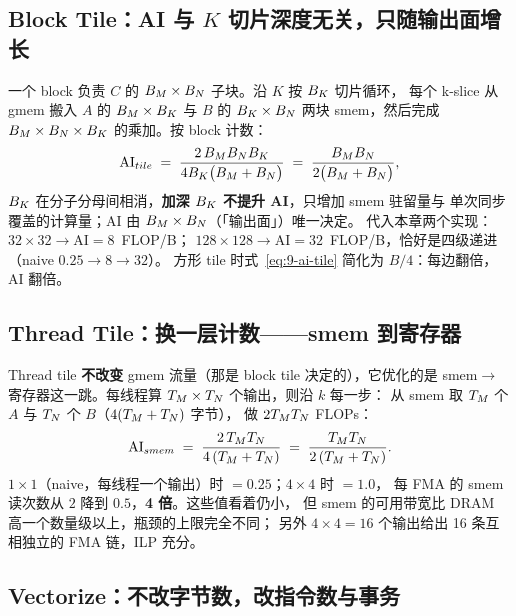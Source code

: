 \subsection{Block Tile：AI 与 $K$ 切片深度无关，只随输出面增长}

一个 block 负责 $C$ 的 $B\sb{M} \times B\sb{N}$ 子块。沿 $K$ 按 $B\sb{K}$ 切片循环，
每个 k-slice 从 gmem 搬入 $A$ 的 $B\sb{M} \times B\sb{K}$ 与 $B$ 的 $B\sb{K} \times B\sb{N}$
两块 smem，然后完成 $B\sb{M} \times B\sb{N} \times B\sb{K}$ 的乘加。按 block 计数：
\begin{equation}
  \mathrm{AI}\sb{tile}
  \;=\; \frac{2\, B\sb{M} B\sb{N} B\sb{K}}
             {4 B\sb{K} \bigl( B\sb{M} + B\sb{N} \bigr)}
  \;=\; \frac{B\sb{M} B\sb{N}}{2 \bigl( B\sb{M} + B\sb{N} \bigr)} ,
  \label{eq:9-ai-tile}
\end{equation}
$B\sb{K}$ 在分子分母间相消，\textbf{加深 $B\sb{K}$ 不提升 AI}，只增加 smem 驻留量与
单次同步覆盖的计算量；AI 由 $B\sb{M} \times B\sb{N}$（「输出面」）唯一决定。
代入本章两个实现：$32 \times 32 \to \mathrm{AI} = 8$~FLOP/B；
$128 \times 128 \to \mathrm{AI} = 32$~FLOP/B，恰好是四级递进（naive $0.25 \to 8 \to 32$）。
方形 tile 时式~\ref{eq:9-ai-tile} 简化为 $B/4$：每边翻倍，AI 翻倍。

\subsection{Thread Tile：换一层计数——smem 到寄存器}

Thread tile \textbf{不改变} gmem 流量（那是 block tile 决定的），它优化的是
smem$\to$寄存器这一跳。每线程算 $T\sb{M} \times T\sb{N}$ 个输出，则沿 $k$ 每一步：
从 smem 取 $T\sb{M}$ 个 $A$ 与 $T\sb{N}$ 个 $B$（$4(T\sb{M} + T\sb{N})$ 字节），
做 $2 T\sb{M} T\sb{N}$ FLOPs：
\begin{equation}
  \mathrm{AI}\sb{smem}
  \;=\; \frac{2\, T\sb{M} T\sb{N}}{4\,(T\sb{M} + T\sb{N})}
  \;=\; \frac{T\sb{M} T\sb{N}}{2\,(T\sb{M} + T\sb{N})} .
  \label{eq:9-ai-thread}
\end{equation}
$1 \times 1$（naive，每线程一个输出）时 $= 0.25$；$4 \times 4$ 时 $= 1.0$，
每 FMA 的 smem 读次数从 $2$ 降到 $0.5$，\textbf{4 倍}。这些值看着仍小，
但 smem 的可用带宽比 DRAM 高一个数量级以上，瓶颈的上限完全不同；
另外 $4 \times 4 = 16$ 个输出给出 16 条互相独立的 FMA 链，ILP 充分。

\subsection{Vectorize：不改字节数，改指令数与事务}

